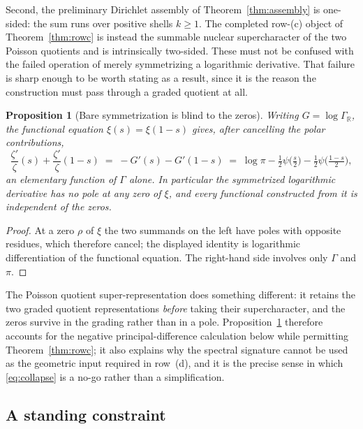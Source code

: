 \documentclass[11pt]{amsart}
\newtheorem{proposition}[theorem]{Proposition}
\theoremstyle{definition}
\theoremstyle{remark}
\begin{document}
Second, the preliminary Dirichlet assembly of
Theorem~\ref{thm:assembly} is one-sided: the sum runs over positive shells
$k\ge1$.  The completed row-(c) object of Theorem~\ref{thm:rowc} is instead
the summable nuclear supercharacter of the two Poisson quotients and is
intrinsically two-sided.  These
must not be confused with the failed operation of merely symmetrizing a
logarithmic derivative.  That failure is sharp enough to be worth stating as
a result, since it is the reason the construction must pass through a graded
quotient at all.

\begin{proposition}[Bare symmetrization is blind to the zeros]
\label{prop:symmetrizationblind}
Writing $G=\log\Gamma_{\mathbb R}$, the functional equation
$\xi(s)=\xi(1-s)$ gives, after cancelling the polar contributions,
\begin{equation}
\label{eq:collapse}
 \frac{\zeta'}{\zeta}(s)+\frac{\zeta'}{\zeta}(1-s)
 \;=\;-G'(s)-G'(1-s)
 \;=\;\log\pi-\tfrac12\psi\!\big(\tfrac s2\big)
 -\tfrac12\psi\!\big(\tfrac{1-s}2\big),
\end{equation}
an elementary function of $\Gamma$ alone.  In particular the symmetrized
logarithmic derivative has no pole at any zero of $\xi$, and every functional
constructed from it is independent of the zeros.
\end{proposition}

\begin{proof}
At a zero $\rho$ of $\xi$ the two summands on the left have poles with
opposite residues, which therefore cancel; the displayed identity is
logarithmic differentiation of the functional equation.  The right-hand side
involves only $\Gamma$ and $\pi$.
\end{proof}

The Poisson quotient super-representation does something different: it
retains the two graded quotient representations \emph{before} taking their
supercharacter, and the zeros survive in the grading rather than in a pole.
Proposition~\ref{prop:symmetrizationblind} therefore
accounts for the negative principal-difference calculation below while permitting
Theorem~\ref{thm:rowc}; it also explains why the spectral signature cannot be
used as the geometric input required in row~(d), and it is the precise sense
in which \eqref{eq:collapse} is a no-go rather than a simplification.

\subsection{A standing constraint}
\label{ss:constraint}
\end{document}
